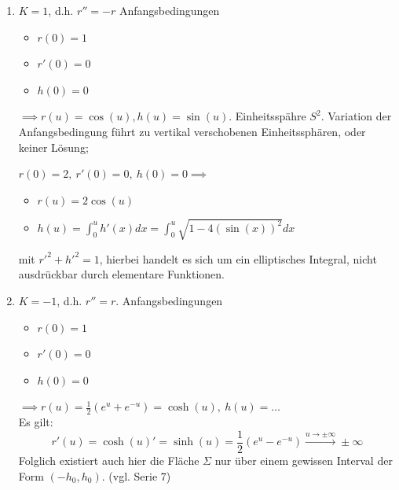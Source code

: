 \documentclass[../main.tex]{subfiles}
\begin{document}
\begin{specialcase}
\begin{enumerate}
    \item
    $K=1$, d.h. $r''=-r$
    Anfangsbedingungen
    \begin{itemize}
        \item $r(0)=1$
        \item $r'(0)=0$
        \item $h(0)=0$
    \end{itemize}
    $\implies r(u)=\cos(u), h(u)=\sin(u)$. Einheitsspähre $S^2$.
    Variation der Anfangsbedingung führt zu vertikal verschobenen Einheitssphären, oder keiner Lösung;
    \begin{example}
        $r(0)=2, \ r'(0)=0, \ h(0)=0 \implies$
        \begin{itemize}
            \item $r(u)=2\cos(u)$
            \item $h(u)=\int_{0}^{u} h'(x) dx = \int_{0}^{u} \sqrt{1-4(\sin(x))^{2}} dx$
        \end{itemize}
        mit $r'^{2}+h'^{2}=1$, hierbei handelt es sich um ein elliptisches Integral, nicht ausdrückbar durch elementare Funktionen.
        \begin{figure}[H]
            \centering
            \def\svgwidth{\textwidth}
            
        \end{figure}
    \end{example}
    \item $K=-1$, d.h. $r'' = r$.
    Anfangsbedingungen
    \begin{itemize}
        \item $r(0)=1$
        \item $r'(0)=0$
        \item $h(0)=0$
    \end{itemize}
    $\implies r(u)=\frac{1}{2}(e^{u}+e^{-u})=\cosh(u),\ h(u)=\dots$ \\ \noindent Es gilt:
    $$r'(u)=\cosh(u)'=\sinh(u)=\frac{1}{2}(e^{u}-e^{-u}) \overset{u \to \pm \infty}{\longrightarrow} \pm \infty$$
    Folglich existiert auch hier die Fläche $\Sigma$ nur über einem gewissen Interval der Form $(-h_{0},h_{0})$. (vgl. Serie 7)
    \begin{figure}[htb]
        \centering
        \def\svgheight{6em}
        
    \end{figure}
\end{enumerate}
\end{specialcase}
\end{document}
